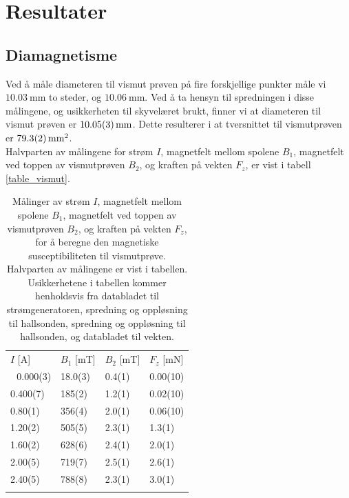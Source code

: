 \documentclass[%
 reprint,
 amsmath,amssymb,
 aps,
]{revtex4-1}
\begin{document}
\section{\label{sec:level4}Resultater}
\subsection{Diamagnetisme}
Ved å måle diameteren til vismut prøven på fire forskjellige punkter måle vi $\SI{10.03}{\milli\meter}$ to steder, og $\SI{10.06}{\milli\meter}$. Ved å ta hensyn til spredningen i disse målingene, og usikkerheten til skyvelæret brukt, finner vi at diameteren til vismut prøven er $\SI{10.05\pm0.03}{\milli\meter}$. Dette resulterer i at tversnittet til vismutprøven er $\SI{79.3\pm0.2}{\milli\meter^2}$.\\
Halvparten av målingene for strøm $I$, magnetfelt mellom spolene $B_1$, magnetfelt ved toppen av vismutprøven $B_2$, og kraften på vekten $F_z$, er vist i tabell \vref{table_vismut}.
\begin{table}
  \centering
  \caption{Målinger av strøm $I$, magnetfelt mellom spolene $B_1$, magnetfelt ved toppen av vismutprøven $B_2$, og kraften på vekten $F_z$, for å beregne den magnetiske susceptibiliteten til vismutprøve. Halvparten av målingene er vist i tabellen. Usikkerhetene i tabellen kommer henholdsvis fra databladet til strømgeneratoren, spredning og oppløsning til hallsonden, spredning og oppløsning til hallsonden, og databladet til vekten.}
  \label{table_vismut}
    \begin{tabular}{@{}llll@{}}\botrule
    $I$ {[}A{]} & $B_1$ {[}mT{]} & $B_2$ {[}mT{]} & $F_z$ {[}mN{]} \\ \colrule 
    0.000(3)    & 18.0(3)        & 0.4(1)         & 0.00(10)      \\
    0.400(7)    & 185(2)         & 1.2(1)         & 0.02(10)      \\
    0.80(1)     & 356(4)         & 2.0(1)         & 0.06(10)      \\
    1.20(2)     & 505(5)         & 2.3(1)         & 1.3(1)        \\
    1.60(2)     & 628(6)         & 2.4(1)         & 2.0(1)        \\
    2.00(5)     & 719(7)         & 2.5(1)         & 2.6(1)        \\
    2.40(5)     & 788(8)         & 2.3(1)         & 3.0(1)        \\\botrule
    \end{tabular}
\end{table}
\end{document}
